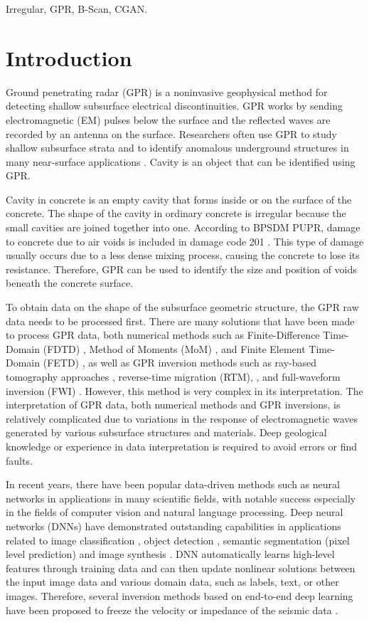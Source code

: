 \documentclass[conference]{IEEEtran}
\begin{document}
\begin{IEEEkeywords}
  Irregular, GPR, B-Scan, CGAN.
\end{IEEEkeywords}

\section{Introduction}
Ground penetrating radar (GPR) is a noninvasive geophysical method for detecting shallow subsurface electrical discontinuities. 
GPR works by sending electromagnetic (EM) pulses below the surface and the reflected waves are recorded by an antenna on the surface. 
Researchers often use GPR to study shallow subsurface strata and to identify anomalous underground structures in many near-surface applications \cite{a1}. 
Cavity is an object that can be identified using GPR.

Cavity in concrete is an empty cavity that forms inside or on the surface of the concrete. 
The shape of the cavity in ordinary concrete is irregular because the small cavities are joined together into one. 
According to BPSDM PUPR, damage to concrete due to air voids is included in damage code 201 \cite{a2}. 
This type of damage usually occurs due to a less dense mixing process, causing the concrete to lose its resistance. 
Therefore, GPR can be used to identify the size and position of voids beneath the concrete surface.

To obtain data on the shape of the subsurface geometric structure, the GPR raw data needs to be processed first. 
There are many solutions that have been made to process GPR data, both numerical methods such as Finite-Difference Time-Domain (FDTD) \cite{a3}, Method of Moments (MoM) \cite{a4}, and Finite Element Time-Domain (FETD) \cite{a5}, 
as well as GPR inversion methods such as ray-based tomography approaches \cite{a6}, reverse-time migration (RTM), \cite{a7}, and full-waveform inversion (FWI) \cite{a8}. 
However, this method is very complex in its interpretation. 
The interpretation of GPR data, both numerical methods and GPR inversions, is relatively complicated due to variations in the response of electromagnetic waves generated by various subsurface structures and materials. 
Deep geological knowledge or experience in data interpretation is required to avoid errors or find faults.

In recent years, there have been popular data-driven methods such as neural networks in applications in many scientific fields, with notable success especially in the fields of computer vision and natural language processing. 
Deep neural networks (DNNs) have demonstrated outstanding capabilities in applications related to image classification \cite{a9}, object detection \cite{a10}, semantic segmentation (pixel level prediction) \cite{a11} and image synthesis \cite{a12}. 
DNN automatically learns high-level features through training data and can then update nonlinear solutions between the input image data and various domain data, such as labels, text, or other images. 
Therefore, several inversion methods based on end-to-end deep learning have been proposed to freeze the velocity or impedance of the seismic data \cite{a13}.
\end{document}
